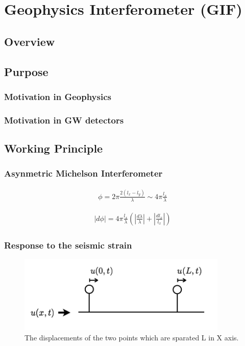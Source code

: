 \chapter{Geophysics Interferometer (GIF)}



\section{Overview} 


\section{Purpose}
\subsection{Motivation in Geophysics}
\subsection{Motivation in GW detectors}


\section{Working Principle}

\subsection{Asynmetric Michelson Interferometer}
\begin{eqnarray}
  \phi = 2\pi\frac{2(l_x-l_y)}{\lambda}\sim4\pi\frac{l_x}{\lambda}
\end{eqnarray}

\begin{eqnarray}
  |d\phi| = 4\pi\frac{l_x}{\lambda}\left( \left|\frac{d\lambda}{\lambda}\right| + \left|\frac{dl_x}{l_x}\right| \right)
\end{eqnarray}


\subsection{Response to the seismic strain}
\begin{figure}[h]
  \begin{center}
    \includegraphics[width=10.0cm]{./img_chap2/img210.png}
    \caption{The displacements of the two points which are sparated L in X axis. }
  \end{center}
\end{figure}

